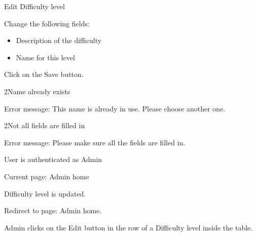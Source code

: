 
\begin{uc}{Edit Difficulty level}

    \begin{uc-mss}
    \item Change the following fields:
        \begin{itemize}
            \item Description of the difficulty
            \item Name for this level
        \end{itemize}
    \item Click on the Save button.
    \end{uc-mss}

    \begin{uc-ext}

                \begin{uc-fail}{2}{Name already exists}
                \item Error message: This name is already in use. Please choose another one.
                \end{uc-fail}

       \begin{uc-fail}{2}{Not all fields are filled in}
        \item Error message: Please make sure all the fields are filled in.
       \end{uc-fail}

    \end{uc-ext}

    \begin{uc-pre}
    \item User is authenticated as Admin
    \item Current page: Admin home
    \end{uc-pre}

    \begin{uc-post}
    \item Difficulty level is updated.
    \item Redirect to page: Admin home.
    \end{uc-post}

    \begin{uc-trig}
        Admin clicks on the Edit button in the row of a Difficulty level inside the table.
    \end{uc-trig}

\end{uc}
